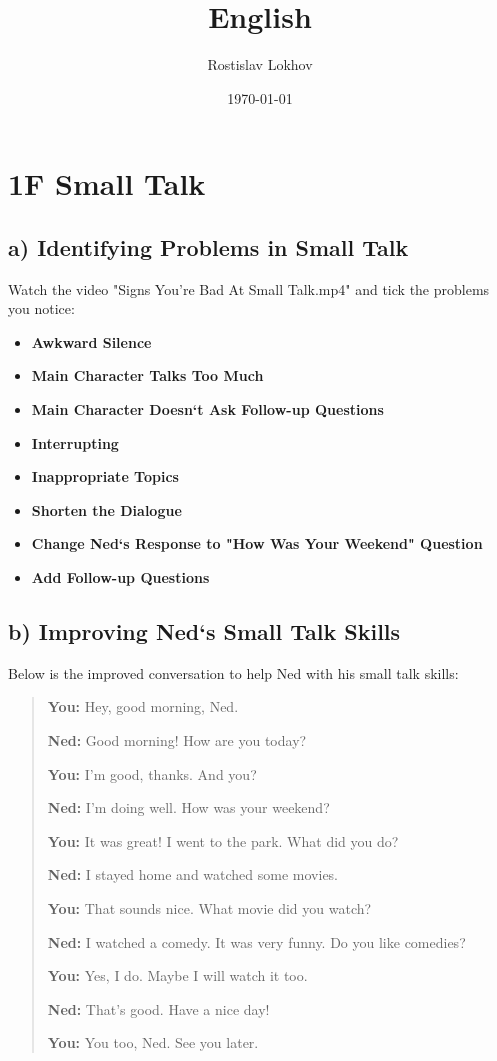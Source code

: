 \documentclass[12pt]{article}
\title{English}
\author{Rostislav Lokhov}
\date{\today}
\begin{document}
\maketitle

\section*{1F Small Talk}

\subsection*{a) Identifying Problems in Small Talk}

Watch the video "Signs You're Bad At Small Talk.mp4" and tick the problems you notice:

\begin{itemize}
    \item \textbf{Awkward Silence} \checkmark
    \item \textbf{Main Character Talks Too Much} \checkmark
    \item \textbf{Main Character Doesn`t Ask Follow-up Questions} \checkmark
    \item \textbf{Interrupting}
    \item \textbf{Inappropriate Topics}
    \item \textbf{Shorten the Dialogue}
    \item \textbf{Change Ned`s Response to "How Was Your Weekend" Question}
    \item \textbf{Add Follow-up Questions} \checkmark
\end{itemize}

\subsection*{b) Improving Ned`s Small Talk Skills}

Below is the improved conversation to help Ned with his small talk skills:

\begin{quote}
\textbf{You:} Hey, good morning, Ned.

\textbf{Ned:} Good morning! How are you today?

\textbf{You:} I'm good, thanks. And you?

\textbf{Ned:} I'm doing well. How was your weekend?

\textbf{You:} It was great! I went to the park. What did you do?

\textbf{Ned:} I stayed home and watched some movies.

\textbf{You:} That sounds nice. What movie did you watch?

\textbf{Ned:} I watched a comedy. It was very funny. Do you like comedies?

\textbf{You:} Yes, I do. Maybe I will watch it too.

\textbf{Ned:} That's good. Have a nice day!

\textbf{You:} You too, Ned. See you later.
\end{quote}
\end{document}
